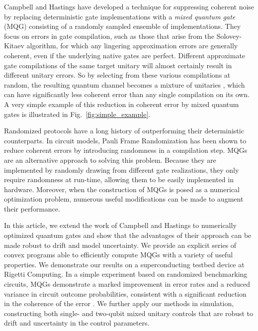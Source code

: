 \documentclass[aps,nofootinbib,pra,notitlepage,twocolumn]{revtex4-1}
\newcommand{\0}{\ensuremath{\mathbf{0}}}
\begin{document}
Campbell \cite{Campbell2017,Campbell2019} and Hastings \cite{Hastings2017} have developed a technique for suppressing coherent noise by replacing deterministic gate implementations with a \emph{mixed quantum gate} (MQG) consisting of a randomly sampled ensemble of implementations. They focus on errors in gate compilation, such as those that arise from the Solovey-Kitaev algorithm, for which any lingering approximation errors are generally coherent, even if the underlying native gates are perfect. Different approximate gate compilations of the same target unitary will almost certainly result in different unitary errors. So by selecting from these various compilations at random, the resulting quantum channel becomes a mixture of unitaries \cite{DBLP:journals/corr/cs-CC-0012017}, which can have significantly less coherent error than any single compilation on its own. A very simple example of this reduction in coherent error by mixed quantum gates is illustrated in Fig.~\ref{fig:simple_example}. 

Randomized protocols have a long history of outperforming their deterministic counterparts\cite{Viola2005, Santos2006}. In circuit models, Pauli Frame Randomization \cite{Wallman2016, 1803.01818, dahlen2018experimental} has been shown to reduce coherent errors by introducing randomness in a compilation step. MQGs are an alternative approach to solving this problem. Because they are implemented by randomly drawing from different gate realizations, they only require randomness at run-time, allowing them to be easily implemented in hardware. Moreover, when the construction of MQGs is posed as a numerical optimization problem, numerous useful modifications can be made to augment their performance.

In this article, we extend the work of Campbell and Hastings to numerically optimized quantum gates and show that the advantages of their approach can be made robust to drift and model uncertainty. We provide an explicit series of convex programs able to efficiently compute MQGs with a variety of useful properties. We demonstrate our results on a superconducting testbed device at Rigetti Computing.  In a simple experiment based on randomized benchmarking circuits, MQGs demonstrate a marked improvement in error rates and a reduced variance in circuit outcome probabilities, consistent with a significant reduction in the coherence of the error \cite{Ball2016}. We further apply our methods in simulation, constructing both single- and two-qubit mixed unitary controls that are robust to drift and uncertainty in the control parameters.
\end{document}
